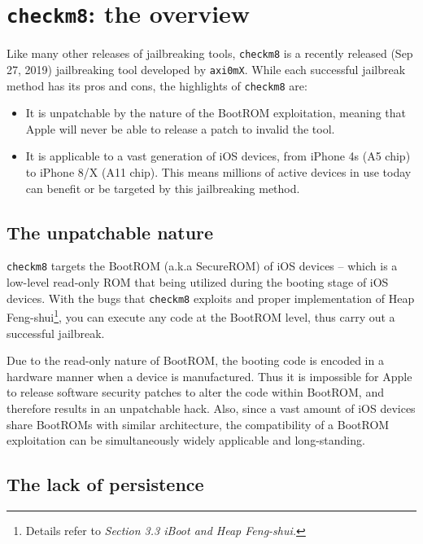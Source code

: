 \documentclass[10pt]{article}
\newcommand{\inlinecode}{\texttt}
\begin{document}
\section{\inlinecode{checkm8}: the overview}

Like many other releases of jailbreaking tools, \inlinecode{checkm8} is a recently released (Sep 27, 2019) jailbreaking tool developed by \inlinecode{axi0mX}. While each successful jailbreak method has its pros and cons, the highlights of \inlinecode{checkm8} are:
\begin{itemize}
    \item It is unpatchable by the nature of the BootROM exploitation, meaning that Apple will never be able to release a patch to invalid the tool.
    \item It is applicable to a vast generation of iOS devices, from iPhone 4s (A5 chip) to iPhone 8/X (A11 chip). This means millions of active devices in use today can benefit or be targeted by this jailbreaking method.
\end{itemize}

\subsection{The unpatchable nature}

\inlinecode{checkm8} targets the BootROM (a.k.a SecureROM) of iOS devices -- which is a low-level read-only ROM that being utilized during the booting stage of iOS devices. With the bugs that \inlinecode{checkm8} exploits and proper implementation of Heap Feng-shui\footnote{Details refer to \textit{Section 3.3 iBoot and Heap Feng-shui.}}, you can execute any code at the BootROM level, thus carry out a successful jailbreak.

Due to the read-only nature of BootROM, the booting code is encoded in a hardware manner when a device is manufactured. Thus it is impossible for Apple to release software security patches to alter the code within BootROM, and therefore results in an unpatchable hack. Also, since a vast amount of iOS devices share BootROMs with similar architecture, the compatibility of a BootROM exploitation can be simultaneously widely applicable and long-standing.

\subsection{The lack of persistence}
\end{document}
